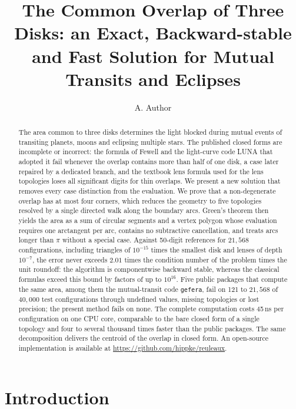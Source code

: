 \documentclass[twocolumn]{aastex701}
\begin{document}
\title{The Common Overlap of Three Disks: an Exact, Backward-stable and Fast Solution for Mutual Transits and Eclipses}

\author{A. Author}

\begin{abstract}
The area common to three disks determines the light blocked during mutual
events of transiting planets, moons and eclipsing multiple stars. The
published closed forms are incomplete or incorrect: the formula of Fewell
and the light-curve code LUNA that adopted it fail whenever the overlap
contains more than half of one disk, a case later repaired by a dedicated
branch, and the textbook lens formula used for the lens topologies loses
all significant digits for thin overlaps. We present a new solution that
removes every case distinction from the evaluation. We prove that a
non-degenerate overlap has at most four corners, which reduces the
geometry to five topologies resolved by a single directed walk along the
boundary arcs. Green's theorem then yields the area as a sum of circular
segments and a vertex polygon whose evaluation requires one arctangent per
arc, contains no subtractive cancellation, and treats arcs longer than
$\pi$ without a special case. Against 50-digit references for $21{,}568$
configurations, including triangles of $10^{-15}$ times the smallest disk
and lenses of depth $10^{-7}$, the error never exceeds $2.01$ times the
condition number of the problem times the unit roundoff: the algorithm is
componentwise backward stable, whereas the classical formulas exceed this
bound by factors of up to $10^{16}$. Five public packages that compute
the same area, among them the mutual-transit code \texttt{gefera}, fail on
121 to $21{,}568$ of $40{,}000$ test configurations through undefined
values, missing topologies or lost precision; the present method fails on
none. The complete computation costs 45\,ns per configuration on one CPU
core, comparable to the bare closed form of a single topology and four to
several thousand times faster than the public packages.
The same decomposition delivers the centroid of the overlap in closed form.
An open-source implementation is available at
\url{https://github.com/hippke/reuleaux}.
\end{abstract}


\section{Introduction} \label{sec:intro}
\end{document}
